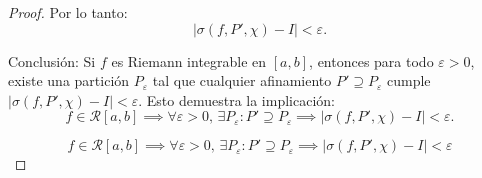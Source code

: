\documentclass{article}
\begin{document}
\begin{proof}
	Por lo tanto:  
	\[
	|\sigma(f, P', \chi) - I| < \varepsilon.
	\]
	
	Conclusión:
	Si \( f \) es Riemann integrable en \([a, b]\), entonces para todo \( \varepsilon > 0 \), existe una partición \( P_\varepsilon \) tal que cualquier afinamiento \( P' \supseteq P_\varepsilon \) cumple \( |\sigma(f, P', \chi) - I| < \varepsilon \). Esto demuestra la implicación:  
	\[
	f \in \mathcal{R}[a, b] \implies \forall \varepsilon > 0,\, \exists P_\varepsilon : P' \supseteq P_\varepsilon \implies |\sigma(f, P', \chi) - I| < \varepsilon.
	\]
	
	\[
	\boxed{
		f \in \mathcal{R}[a, b] \implies \forall \varepsilon > 0,\, \exists P_\varepsilon : P' \supseteq P_\varepsilon \implies |\sigma(f, P', \chi) - I| < \varepsilon
	}
	\]
		
	\end{proof}
	
\end{document}
